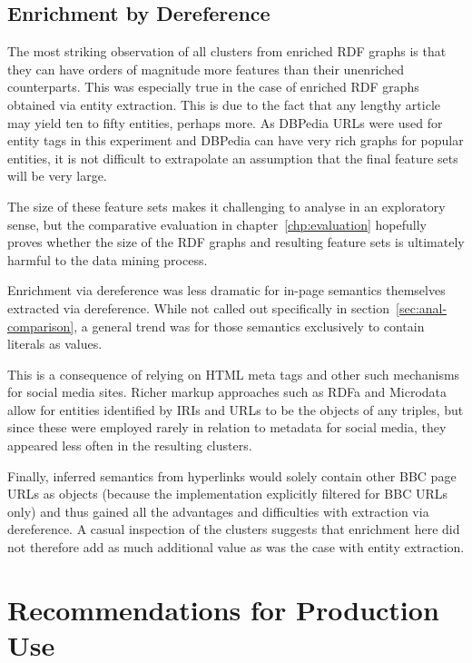 \subsection{Enrichment by Dereference}
\label{sec:anal-enrichment}

The most striking observation of all clusters from enriched RDF
graphs is that they can have orders of magnitude more features than
their unenriched counterparts. This was especially true in the case
of enriched RDF graphs obtained via entity extraction. This is due
to the fact that any lengthy article may yield ten to fifty entities,
perhaps more. As DBPedia URLs were used for entity tags in this
experiment and DBPedia can have very rich graphs for popular entities,
it is not difficult to extrapolate an assumption that the final
feature sets will be very large.

The size of these feature sets makes it challenging to analyse in an
exploratory sense, but the comparative evaluation in
chapter~\ref{chp:evaluation} hopefully proves whether the size of the
RDF graphs and resulting feature sets is ultimately harmful to the
data mining process.

Enrichment via dereference was less dramatic for in-page semantics
themselves extracted via dereference. While not called out
specifically in section~\ref{sec:anal-comparison}, a general trend
was for those semantics exclusively to contain literals as values.

This is a consequence of relying on HTML meta tags and other such
mechanisms for social media sites. Richer markup approaches such
as RDFa and Microdata allow for entities identified by IRIs and URLs
to be the objects of any triples, but since these were employed
rarely in relation to metadata for social media, they appeared
less often in the resulting clusters.

Finally, inferred semantics from hyperlinks would solely contain
other BBC page URLs as objects (because the implementation explicitly
filtered for BBC URLs only) and thus gained all the advantages and
difficulties with extraction via dereference. A casual inspection
of the clusters suggests that enrichment here did not therefore add
as much additional value as was the case with entity extraction.

\section{Recommendations for Production Use}
\label{sec:production-recommendations}

